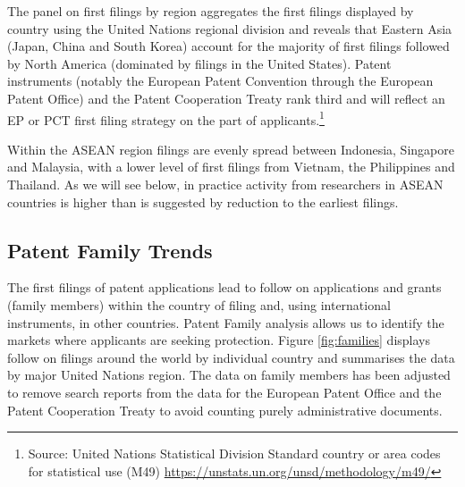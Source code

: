 \documentclass[]{book}
\let\rmarkdownfootnote\footnote%
\def\footnote{\protect\rmarkdownfootnote}
\theoremstyle{definition}
\theoremstyle{definition}
\theoremstyle{definition}
\theoremstyle{remark}
\begin{document}
The panel on first filings by region aggregates the first filings
displayed by country using the United Nations regional division and
reveals that Eastern Asia (Japan, China and South Korea) account for the
majority of first filings followed by North America (dominated by
filings in the United States). Patent instruments (notably the European
Patent Convention through the European Patent Office) and the Patent
Cooperation Treaty rank third and will reflect an EP or PCT first filing
strategy on the part of applicants.\footnote{Source: United Nations
  Statistical Division Standard country or area codes for statistical
  use (M49) \url{https://unstats.un.org/unsd/methodology/m49/}}

Within the ASEAN region filings are evenly spread between Indonesia,
Singapore and Malaysia, with a lower level of first filings from
Vietnam, the Philippines and Thailand. As we will see below, in practice
activity from researchers in ASEAN countries is higher than is suggested
by reduction to the earliest filings.

\hypertarget{patent-family-trends}{%
\subsection{Patent Family Trends}\label{patent-family-trends}}

The first filings of patent applications lead to follow on applications
and grants (family members) within the country of filing and, using
international instruments, in other countries. Patent Family analysis
allows us to identify the markets where applicants are seeking
protection. Figure \ref{fig:families} displays follow on filings around
the world by individual country and summarises the data by major United
Nations region. The data on family members has been adjusted to remove
search reports from the data for the European Patent Office and the
Patent Cooperation Treaty to avoid counting purely administrative
documents.
\end{document}
